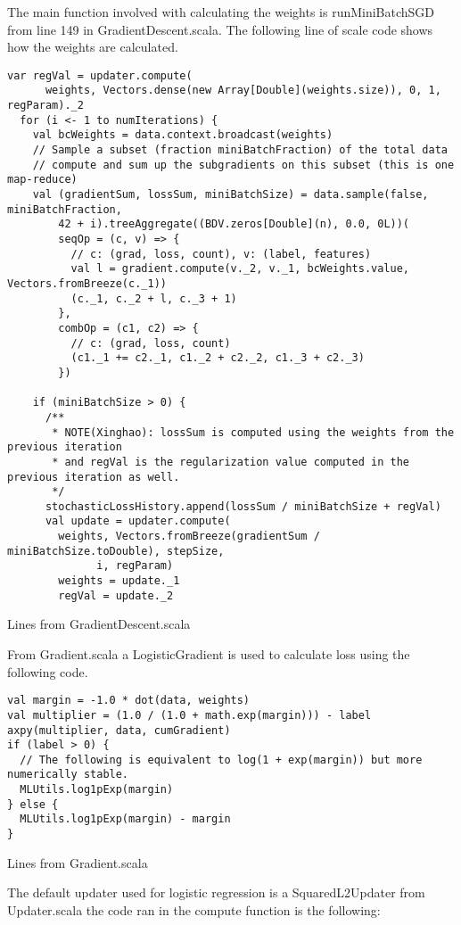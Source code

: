 The main function involved with calculating the weights is runMiniBatchSGD from line 149 in GradientDescent.scala. The following line of scale code shows how the weights are calculated. 
\begin{listing}[H]
\begin{verbatim}
var regVal = updater.compute(
      weights, Vectors.dense(new Array[Double](weights.size)), 0, 1, regParam)._2
  for (i <- 1 to numIterations) {
    val bcWeights = data.context.broadcast(weights)
    // Sample a subset (fraction miniBatchFraction) of the total data
    // compute and sum up the subgradients on this subset (this is one map-reduce)
    val (gradientSum, lossSum, miniBatchSize) = data.sample(false, miniBatchFraction, 
        42 + i).treeAggregate((BDV.zeros[Double](n), 0.0, 0L))(
        seqOp = (c, v) => {
          // c: (grad, loss, count), v: (label, features)
          val l = gradient.compute(v._2, v._1, bcWeights.value, Vectors.fromBreeze(c._1))
          (c._1, c._2 + l, c._3 + 1)
        },
        combOp = (c1, c2) => {
          // c: (grad, loss, count)
          (c1._1 += c2._1, c1._2 + c2._2, c1._3 + c2._3)
        })

    if (miniBatchSize > 0) {
      /**
       * NOTE(Xinghao): lossSum is computed using the weights from the previous iteration
       * and regVal is the regularization value computed in the previous iteration as well.
       */
      stochasticLossHistory.append(lossSum / miniBatchSize + regVal)
      val update = updater.compute(
        weights, Vectors.fromBreeze(gradientSum / miniBatchSize.toDouble), stepSize,
              i, regParam)
        weights = update._1
        regVal = update._2
\end{verbatim}
\caption{Lines from GradientDescent.scala}
\label{lst:runMiniBatchSGD}
\end{listing}

From Gradient.scala a LogisticGradient is used to calculate loss using the following code. 
\begin{listing}[H]
\begin{verbatim}
val margin = -1.0 * dot(data, weights)
val multiplier = (1.0 / (1.0 + math.exp(margin))) - label
axpy(multiplier, data, cumGradient)
if (label > 0) {
  // The following is equivalent to log(1 + exp(margin)) but more numerically stable.
  MLUtils.log1pExp(margin)
} else {
  MLUtils.log1pExp(margin) - margin
} 
\end{verbatim}
\caption{Lines from Gradient.scala}
\label{lst:sparkloss}
\end{listing}
The default updater used for logistic regression is a SquaredL2Updater from Updater.scala
the code ran in the compute function is the following: 

